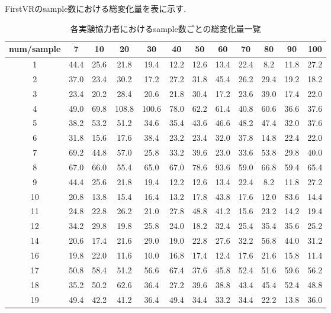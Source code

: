 \documentclass{ltjsreport}
\begin{document}
\clearpage
		FirstVRのsample数における総変化量を表に示す.
		\begin{table}[H]
		\begin{center}
		\caption{各実験協力者におけるsample数ごとの総変化量一覧}
		\label{tab:FVRdata}
		\begin{tabular}{c|ccccccccccc} \toprule
			num/sample & 7 & 10 & 20 & 30 & 40 & 50 & 60 & 70 & 80 & 90 & 100 \\ \hline
			1 & 44.4 & 25.6 & 21.8 & 19.4 & 12.2 & 12.6 & 13.4 & 22.4 & 8.2 & 11.8 & 27.2 \\
			2 & 37.0 & 23.4 & 30.2 & 17.2 & 27.2 & 31.8 & 45.4 & 26.2 & 29.4 & 19.2 & 18.2 \\
			3 & 23.4 & 20.2 & 28.4 & 20.6 & 21.8 & 30.4 & 17.2 & 23.6 & 39.0 & 17.4 & 22.0 \\
			4 & 49.0 & 69.8 & 108.8 & 100.6 & 78.0 & 62.2 & 61.4 & 40.8 & 60.6 & 36.6 & 37.6 \\
			5 & 38.2 & 53.2 & 51.2 & 34.6 & 35.4 & 43.6 & 46.6 & 48.2 & 47.4 & 32.0 & 37.6 \\
			6 & 31.8 & 15.6 & 17.6 & 38.4 & 23.2 & 23.4 & 32.0 & 37.8 & 14.8 & 22.4 & 22.0 \\
			7 & 69.2 & 44.8 & 57.0 & 25.8 & 33.2 & 39.6 & 23.0 & 33.6 & 53.8 & 29.8 & 40.0 \\
			8 & 67.0 & 66.0 & 55.4 & 65.0 & 67.0 & 78.6 & 93.6 & 59.0 & 66.8 & 59.4 & 65.4 \\
			9 & 44.4 & 25.6 & 21.8 & 19.4 & 12.2 & 12.6 & 13.4 & 22.4 & 8.2 & 11.8 & 27.2 \\
			10 & 20.8 & 13.8 & 15.4 & 16.4 & 13.2 & 17.8 & 43.8 & 17.6 & 12.0 & 83.6 & 14.4 \\
			11 & 24.8 & 22.8 & 26.2 & 21.0 & 27.8 & 48.8 & 41.2 & 15.6 & 23.2 & 14.2 & 19.4 \\
			12 & 34.2 & 29.8 & 19.8 & 25.8 & 24.0 & 18.2 & 32.4 & 25.4 & 35.4 & 35.6 & 25.2 \\
			14 & 20.6 & 17.4 & 21.6 & 29.0 & 19.0 & 22.8 & 27.6 & 32.2 & 56.8 & 44.0 & 31.2 \\
			16 & 19.8 & 22.0 & 11.6 & 10.0 & 16.8 & 17.4 & 12.4 & 17.6 & 21.6 & 15.8 & 11.4 \\
			17 & 50.8 & 58.4 & 51.2 & 56.6 & 67.4 & 37.6 & 45.8 & 52.4 & 51.6 & 59.6 & 56.2 \\
			18 & 35.2 & 50.2 & 62.6 & 36.4 & 27.2 & 39.6 & 38.8 & 43.4 & 45.4 & 52.4 & 48.8 \\
			19 & 49.4 & 42.2 & 41.2 & 36.4 & 49.4 & 34.4 & 33.2 & 34.4 & 22.2 & 13.8 & 36.0 \\

\end{tabular}
\end{center}
\end{table}
\end{document}
